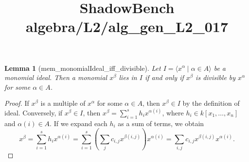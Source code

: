 \documentclass{article}
\title{ShadowBench algebra/L2/alg\_gen\_L2\_017}
\newtheorem{lemma}{Lemma}
\begin{document}
\maketitle

\begin{lemma}[mem_monomialIdeal_iff_divisible]\label{lem:mem_monomialIdeal_iff_divisible} %
    Let $I = \langle x^\alpha \mid \alpha \in A \rangle$ be a monomial ideal.
    Then a monomial $x^\beta$ lies in $I$ if and only if $x^\beta$ is divisible by $x^\alpha$ for some $\alpha \in A$.
\end{lemma}
\begin{proof}
  If $x^\beta$ is a multiple of $x^\alpha$ for some $\alpha \in A$, then $x^\beta \in I$ by the definition of ideal. 
  Conversely, if $x^\beta \in I$, then $x^\beta = \sum_{i=1}^s h_i x^{\alpha(i)}$, where $h_i \in k[x_1, \dots, x_n]$ and $\alpha(i) \in A$. 
  If we expand each $h_i$ as a sum of terms, we obtain
  \[
  x^\beta = \sum_{i=1}^s h_i x^{\alpha(i)} = \sum_{i=1}^s \left(\sum_j c_{i,j} x^{\beta(i,j)}\right) x^{\alpha(i)} = \sum_{i,j} c_{i,j} x^{\beta(i,j)} x^{\alpha(i)}.
  \]
\end{proof}
\end{document}
